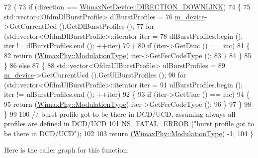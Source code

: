 \begin{DoxyCode}
72 \{
73   \textcolor{keywordflow}{if} (direction == \hyperlink{classns3_1_1WimaxNetDevice_a194b6cf7eb59582328eb2531dc9ed884a5873dae7c36e21d904ae2d6922835e89}{WimaxNetDevice::DIRECTION\_DOWNLINK})
74     \{
75       std::vector<OfdmDlBurstProfile> dlBurstProfiles =
76         \hyperlink{classns3_1_1BurstProfileManager_a06f0dc89653cc9299d1b6f3cb050afc1}{m\_device}->GetCurrentDcd ().GetDlBurstProfiles ();
77       \textcolor{keywordflow}{for} (std::vector<OfdmDlBurstProfile>::iterator iter =
78              dlBurstProfiles.begin (); iter != dlBurstProfiles.end (); ++iter)
79         \{
80           \textcolor{keywordflow}{if} (iter->GetDiuc () == iuc)
81             \{
82               \textcolor{keywordflow}{return} (\hyperlink{classns3_1_1WimaxPhy_a044c5d8a48ca992c39c2a946f6e755fa}{WimaxPhy::ModulationType}) iter->GetFecCodeType ();
83             \}
84         \}
85     \}
86   \textcolor{keywordflow}{else}
87     \{
88       std::vector<OfdmUlBurstProfile> ulBurstProfiles =
89         \hyperlink{classns3_1_1BurstProfileManager_a06f0dc89653cc9299d1b6f3cb050afc1}{m\_device}->GetCurrentUcd ().GetUlBurstProfiles ();
90       \textcolor{keywordflow}{for} (std::vector<OfdmUlBurstProfile>::iterator iter =
91              ulBurstProfiles.begin (); iter != ulBurstProfiles.end (); ++iter)
92         \{
93           \textcolor{keywordflow}{if} (iter->GetUiuc () == iuc)
94             \{
95               \textcolor{keywordflow}{return} (\hyperlink{classns3_1_1WimaxPhy_a044c5d8a48ca992c39c2a946f6e755fa}{WimaxPhy::ModulationType}) iter->GetFecCodeType ();
96             \}
97         \}
98     \}
99 
100   \textcolor{comment}{// burst profile got to be there in DCD/UCD, assuming always all profiles are defined in DCD/UCD}
101   \hyperlink{group__fatal_ga5131d5e3f75d7d4cbfd706ac456fdc85}{NS\_FATAL\_ERROR} (\textcolor{stringliteral}{"burst profile got to be there in DCD/UCD"});
102 
103   \textcolor{keywordflow}{return} (\hyperlink{classns3_1_1WimaxPhy_a044c5d8a48ca992c39c2a946f6e755fa}{WimaxPhy::ModulationType}) -1;
104 \}
\end{DoxyCode}


Here is the caller graph for this function\+:


